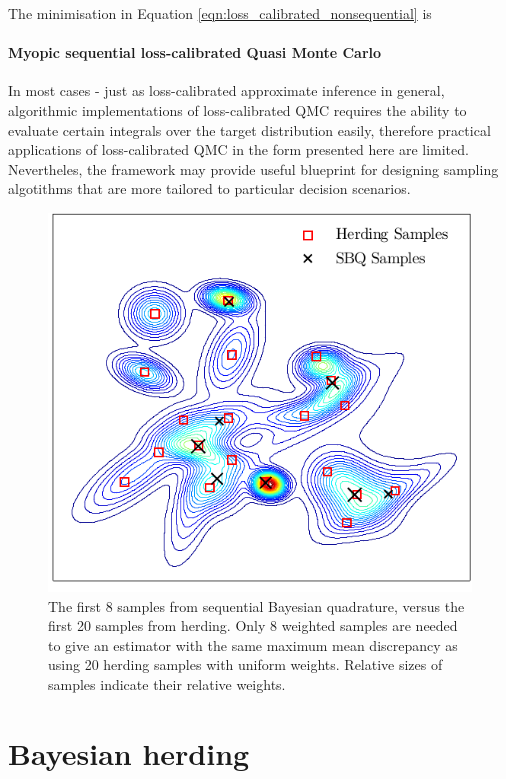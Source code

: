 The minimisation in Equation \eqref{eqn:loss_calibrated_nonsequential} is 
\paragraph{Myopic sequential loss-calibrated Quasi Monte Carlo}


In most cases - just as loss-calibrated approximate inference in general, algorithmic implementations of loss-calibrated QMC requires the ability to evaluate certain integrals over the target distribution easily, therefore practical applications of loss-calibrated QMC in the form presented here are limited. Nevertheles, the framework may provide useful blueprint for designing sampling algotithms that are more tailored to particular decision scenarios.

\begin{figure}[h]
\centering
\includegraphics[width=\columnwidth]{figs/herding/fig1_v2}
\caption[Sequential Bayesian quadrature versus kernel herding]{The first 8 samples from sequential Bayesian quadrature, versus the first 20 samples from herding.  Only 8 weighted \sbq{} samples are needed to give an estimator with the same maximum mean discrepancy as using 20 herding samples with uniform weights.  Relative sizes of samples indicate their relative weights.}
\label{fig:fig1}
\end{figure} 

\section{Bayesian herding\label{sec:herding}}

